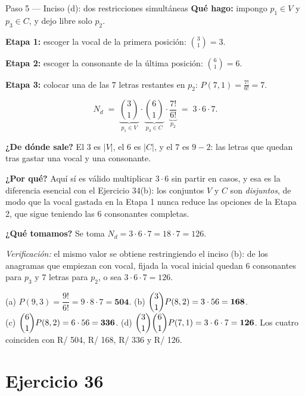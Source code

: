 \documentclass[11pt]{article}
\begin{document}
\begin{paso}{Paso 5 --- Inciso (d): dos restricciones simultáneas}
\textbf{Qué hago:} impongo $p_1\in V$ y $p_3\in C$, y dejo libre solo $p_2$.

\medskip
\textbf{Etapa 1:} escoger la vocal de la primera posición: $\displaystyle\binom{3}{1}=3$.

\textbf{Etapa 2:} escoger la consonante de la última posición: $\displaystyle\binom{6}{1}=6$.

\textbf{Etapa 3:} colocar una de las $7$ letras restantes en $p_2$: $\displaystyle P(7,1)=\frac{7!}{6!}=7$.

\medskip
\[
  N_d \;=\; \underbrace{\binom{3}{1}}_{p_1\in V} \cdot \underbrace{\binom{6}{1}}_{p_3\in C} \cdot \underbrace{\frac{7!}{6!}}_{p_2} \;=\; 3\cdot 6\cdot 7 .
\]

\textbf{¿De dónde sale?} El $3$ es $|V|$, el $6$ es $|C|$, y el $7$ es $9-2$: las letras que quedan tras gastar una vocal y una consonante.

\textbf{¿Por qué?} Aquí sí es válido multiplicar $3\cdot 6$ sin partir en casos, y esa es la diferencia esencial con el Ejercicio 34(b): los conjuntos $V$ y $C$ son \emph{disjuntos}, de modo que la vocal gastada en la Etapa 1 nunca reduce las opciones de la Etapa 2, que sigue teniendo las $6$ consonantes completas.

\textbf{¿Qué tomamos?} Se toma $N_d = 3\cdot 6\cdot 7 = 18\cdot 7 = 126$.

\emph{Verificación:} el mismo valor se obtiene restringiendo el inciso (b): de los anagramas que empiezan con vocal, fijada la vocal inicial quedan $6$ consonantes para $p_3$ y $7$ letras para $p_2$, o sea $3\cdot 6\cdot 7=126$.
\end{paso}

\begin{resp}
(a) $P(9,3)=\dfrac{9!}{6!}=9\cdot 8\cdot 7=\mathbf{504}$.\quad
(b) $\dbinom{3}{1}P(8,2)=3\cdot 56=\mathbf{168}$.\\[2pt]
(c) $\dbinom{6}{1}P(8,2)=6\cdot 56=\mathbf{336}$.\quad
(d) $\dbinom{3}{1}\dbinom{6}{1}P(7,1)=3\cdot 6\cdot 7=\mathbf{126}$. Los cuatro coinciden con R/ 504, R/ 168, R/ 336 y R/ 126.
\end{resp}

\section*{Ejercicio 36}
\end{document}
